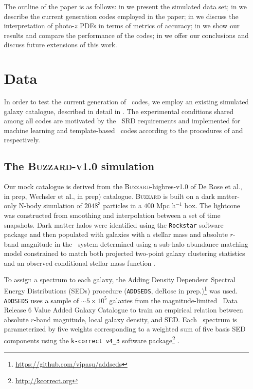 The outline of the paper is as follows: in  we present the simulated data set; in  we describe the current generation codes employed in the paper; in  we discuss the interpretation of photo-$z$ PDFs in terms of metrics of accuracy; in  we show our results and compare the performance of the codes; in  we offer our conclusions and discuss future extensions of this work.

\section{Data}

In order to test the current generation of \pzpdf\ codes, we employ an existing simulated galaxy catalogue, described in detail in .
The experimental conditions shared among all codes are motivated by the \lsst\ SRD requirements and implemented for machine learning and template-based \pzpdf\ codes according to the procedures of  and  respectively.

\subsection{The \textsc{Buzzard-v1.0} simulation}

Our mock catalogue is derived from the \textsc{Buzzard}-highres-v1.0  of De Rose et al., in prep, Wechsler et al., in prep) catalogue.
\textsc{Buzzard} is built on a dark matter-only N-body simulation of $2048^{3}$ particles in a $400$ Mpc h$^{-1}$ box.
The lightcone was constructed from smoothing and interpolation between a set of time snapshots.
Dark matter halos were identified using the \texttt{Rockstar} software package \citep{Behroozi:13} and then populated with galaxies with a stellar mass and absolute $r$-band magnitude in the \sdss\ system determined using a sub-halo abundance matching model constrained to match both projected two-point galaxy clustering statistics and an observed conditional stellar mass function \citep{Reddick:13}.

To assign a spectrum to each galaxy, the Adding Density Dependent Spectral Energy Distributions (SEDs) procedure (\texttt{ADDSEDS}, deRose in prep.)\footnote{\url{https://github.com/vipasu/addseds}} was used.
\texttt{ADDSEDS} uses a sample of $\sim 5\times 10^{5}$ galaxies from the magnitude-limited \sdss\ Data Release 6 Value Added Galaxy Catalogue \citep{Blanton:05} to train an empirical relation between absolute $r$-band magnitude, local galaxy density, and SED.
Each \sdss\ spectrum is parameterized by five weights corresponding to a weighted sum of five basis SED components using the \texttt{k-correct v4\_3} software package\footnote{\url{http://kcorrect.org}} \citep{Blanton:07}.

